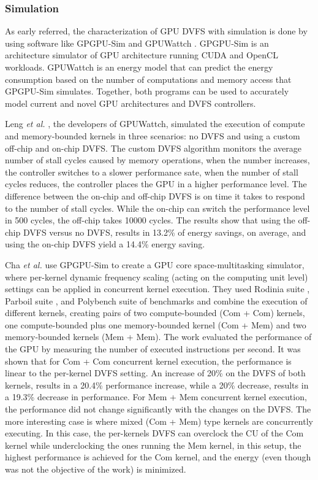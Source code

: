 \subsubsection{Simulation}

As early referred, the characterization of GPU DVFS with simulation is done by using software like GPGPU-Sim \cite{noauthor_gpgpu-sim/gpgpu-sim_distribution_2019} and GPUWattch \cite{noauthor_gpu_nodate} \cite{leng_gpuwattch:_2013}. GPGPU-Sim is an architecture simulator of GPU architecture running CUDA and OpenCL workloads. GPUWattch is an energy model that can predict the energy consumption based on the number of computations and memory access that GPGPU-Sim simulates. Together, both programs can be used to accurately model current and novel GPU architectures and DVFS controllers.

Leng \textit{et al.} \cite{leng_gpuwattch:_2013}, the developers of GPUWattch, simulated the execution of compute and memory-bounded kernels in three scenarios: no DVFS and using a custom off-chip and on-chip DVFS. The custom DVFS algorithm monitors the average number of stall cycles caused by memory operations, when the number increases, the controller switches to a slower performance sate, when the number of stall cycles reduces, the controller places the GPU in a higher performance level. The difference between the on-chip and off-chip DVFS is on time it takes to respond to the number of stall cycles. While the on-chip can switch the performance level in 500 cycles, the off-chip takes 10000 cycles. The results show that using the off-chip DVFS versus no DVFS, results in 13.2\% of energy savings, on average, and using the on-chip DVFS yield a 14.4\% energy saving.

Cha \textit{et al.} \cite{cha_core-level_2018} use GPGPU-Sim to create a GPU core space-multitasking simulator, where per-kernel dynamic frequency scaling (acting on the computing unit level) settings can be applied in concurrent kernel execution. They used Rodinia suite \cite{che_rodinia:_2009}, Parboil suite \cite{stratton_parboil:_nodate}, and Polybench suite \cite{noauthor_polybench/c_nodate} of benchmarks and combine the execution of different kernels, creating pairs of two compute-bounded (Com + Com) kernels, one compute-bounded plus one memory-bounded kernel (Com + Mem) and two memory-bounded kernels (Mem + Mem). The work evaluated the performance of the GPU by measuring the number of executed instructions per second. It was shown that for Com + Com concurrent kernel execution, the performance is linear to the per-kernel DVFS setting. An increase of 20\% on the DVFS of both kernels, results in a 20.4\% performance increase, while a 20\% decrease, results in a 19.3\% decrease in performance. For Mem + Mem concurrent kernel execution, the performance did not change significantly with the changes on the DVFS. The more interesting case is where mixed (Com + Mem) type kernels are concurrently executing. In this case, the per-kernels DVFS can overclock the CU of the Com kernel while underclocking the ones running the Mem kernel, in this setup, the highest performance is achieved for the Com kernel, and the energy (even though was not the objective of the work) is minimized.

